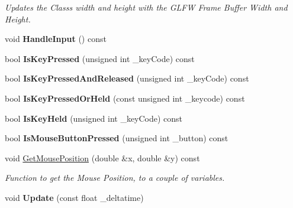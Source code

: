 \begin{DoxyCompactItemize}
\begin{DoxyCompactList}\small\item\em Updates the Class\textquotesingle{}s width and height with the G\+L\+FW Frame Buffer Width and Height. \end{DoxyCompactList}\item 
void {\bfseries Handle\+Input} () const
\item 
bool {\bfseries Is\+Key\+Pressed} (unsigned int \+\_\+key\+Code) const
\item 
bool {\bfseries Is\+Key\+Pressed\+And\+Released} (unsigned int \+\_\+key\+Code) const
\item 
bool {\bfseries Is\+Key\+Pressed\+Or\+Held} (const unsigned int \+\_\+keycode) const
\item 
bool {\bfseries Is\+Key\+Held} (unsigned int \+\_\+key\+Code) const
\item 
bool {\bfseries Is\+Mouse\+Button\+Pressed} (unsigned int \+\_\+button) const
\item 
void \mbox{\hyperlink{group___getters_ga65b02b0e52540d4c2c9d13689f4ec45a}{Get\+Mouse\+Position}} (double \&x, double \&y) const
\begin{DoxyCompactList}\small\item\em Function to get the Mouse Position, to a couple of variables. \end{DoxyCompactList}\item 
void {\bfseries Update} (const float \+\_\+deltatime)
\end{DoxyCompactItemize}
